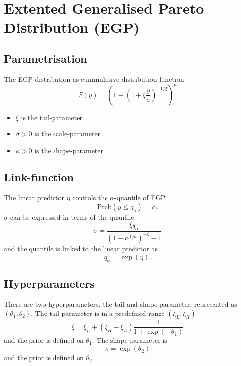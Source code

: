 \documentclass[a4paper,11pt]{article}
\begin{document}
\section*{Extented Generalised Pareto Distribution (EGP)}

\subsection*{Parametrisation}

The EGP distribution as cummulative distribution function
\begin{displaymath}
    F(y) = \left(1-\left(1 + \xi \frac{y}{\sigma}\right)^{-1/\xi}\right)^{\kappa}
\end{displaymath}
\begin{itemize}
\item $\xi$ is the tail-parameter
\item $\sigma > 0$ is the scale-parameter
\item $\kappa > 0$ is the shape-parameter
\end{itemize}

\subsection*{Link-function}

The linear predictor $\eta$ controls the $\alpha$-quantile of EGP
\begin{displaymath}
    \text{Prob}(y \le q_\alpha)=\alpha.
\end{displaymath}
$\sigma$ can be expressed in terms of the quantile
\begin{displaymath}
    \sigma = \frac{\xi q_\alpha}{(1-\alpha^{1/\kappa})^{-\xi} -1}
\end{displaymath}
and the quantile is linked to the linear predictor as
\begin{displaymath}
    q_\alpha = \exp(\eta).
\end{displaymath}

\subsection*{Hyperparameters}

There are two hyperparameters, the tail and shape parameter,
 represented as $(\theta_1, \theta_2)$. The tail-parameter is in a
predefined range $(\xi_L, \xi_H)$
\begin{displaymath}
    \xi = \xi_L + (\xi_H - \xi_L) \frac{1}{1+\exp(-\theta_1)}
\end{displaymath}
and the prior is defined on $\theta_1$. The shape-parameter is
\begin{displaymath}
    \kappa = \exp(\theta_2)
\end{displaymath}
and the prior is defined on $\theta_2$.
\end{document}
